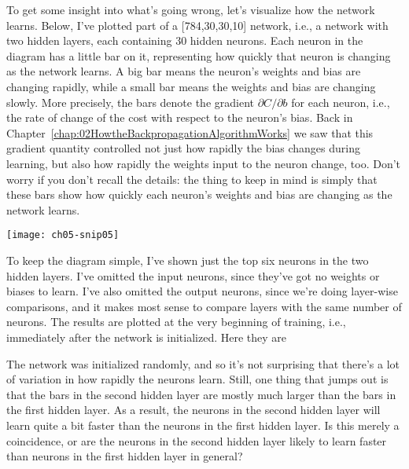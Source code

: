 To get some insight into what's going wrong, let's visualize how the network learns. Below, I've plotted part of a [784,30,30,10]
network, i.e., a network with two hidden layers, each containing 30 hidden neurons. Each neuron in the diagram has a little bar on it, representing how quickly that neuron is changing as the network learns. A big bar means the neuron's weights and bias are changing rapidly, while a small bar means the weights and bias are changing slowly. More precisely, the bars denote the gradient $\partial C / \partial b$ for each neuron, i.e., the rate of change of the cost with respect to the neuron's bias. Back in Chapter~\ref{chap:02HowtheBackpropagationAlgorithmWorks} we saw that this gradient quantity controlled not just how rapidly the bias changes during learning, but also how rapidly the weights input to the neuron change, too. Don't worry if you don't recall the details: the thing to keep in mind is simply that these bars show how quickly each neuron's weights and bias are changing as the network learns.
\begin{marginfigure}
    \texttt{[image: ch05-snip05]}
    \end{marginfigure}
To keep the diagram simple, I've shown just the top six neurons in the two hidden layers. I've omitted the input neurons, since they've got no weights or biases to learn. I've also omitted the output neurons, since we're doing layer-wise comparisons, and it makes most sense to compare layers with the same number of neurons. The results are plotted at the very beginning of training, i.e., immediately after the network is initialized. Here they are

The network was initialized randomly, and so it's not surprising that there's a lot of variation in how rapidly the neurons learn. Still, one thing that jumps out is that the bars in the second hidden layer are mostly much larger than the bars in the first hidden layer. As a result, the neurons in the second hidden layer will learn quite a bit faster than the neurons in the first hidden layer. Is this merely a coincidence, or are the neurons in the second hidden layer likely to learn faster than neurons in the first hidden layer in general?

